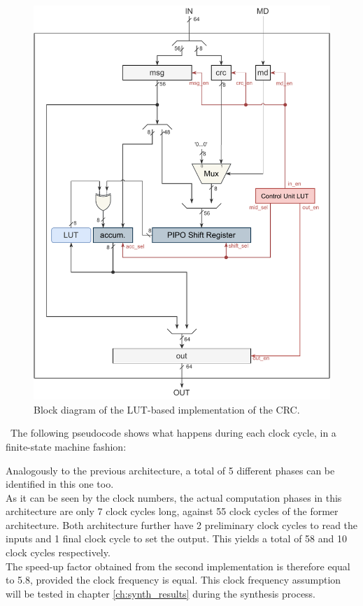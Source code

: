 \begin{figure}[H]
    \begin{center}
        \includegraphics[scale=.85,clip]{img/block_diagram_lut.pdf}
    \end{center}
    \vspace*{-0.5cm}
    \caption{Block diagram of the LUT-based implementation of the CRC.}
    \label{fig:block_diagram_lut}
\end{figure}

\
The following pseudocode shows what happens during each clock cycle, in a finite-state machine fashion:
\pagebreak

\lstset{style=codestyle}\label{code:FSM_LUT}

\hfill \break
Analogously to the previous architecture, a total of 5 different phases can be identified in this one too.\\
\hfill \break
As it can be seen by the clock numbers, the actual computation phases in this architecture are only 7 clock cycles long, against 55 clock cycles of the former architecture. Both architecture further have 2 preliminary clock cycles to read the inputs and 1 final clock cycle to set the output. This yields a total of 58 and 10 clock cycles respectively.\\
The speed-up factor obtained from the second implementation is therefore equal to 5.8, provided the clock frequency is equal. This clock frequency assumption will be tested in chapter \ref{ch:synth_results} during the synthesis process.

